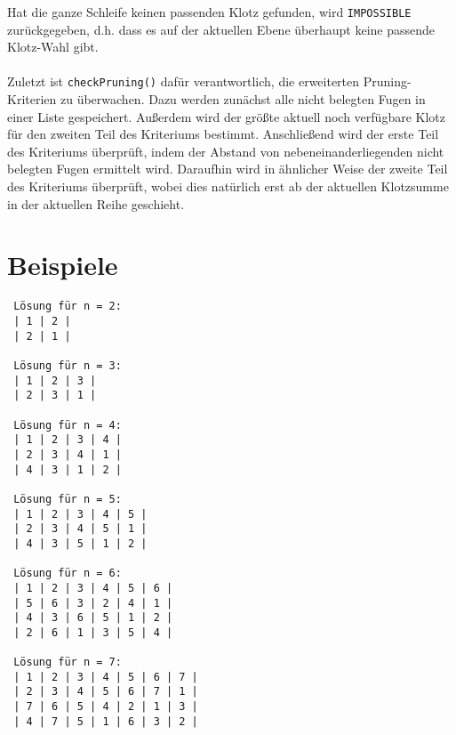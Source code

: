 \documentclass[a4paper, notitlepage, 12pt]{scrartcl}
\begin{document}
Hat die ganze Schleife keinen passenden Klotz gefunden, wird \texttt{IMPOSSIBLE} zurückgegeben, d.h. dass es auf der aktuellen Ebene überhaupt keine passende Klotz-Wahl gibt.
\\ \\
Zuletzt ist \texttt{checkPruning()} dafür verantwortlich, die erweiterten Pruning-Kriterien zu überwachen. Dazu werden zunächst alle nicht belegten Fugen in einer Liste gespeichert. Außerdem wird der größte aktuell noch verfügbare Klotz für den zweiten Teil des Kriteriums bestimmt. Anschließend wird der erste Teil des Kriteriums überprüft, indem der Abstand von nebeneinanderliegenden nicht belegten Fugen ermittelt wird. Daraufhin wird in ähnlicher Weise der zweite Teil des Kriteriums überprüft, wobei dies natürlich erst ab der aktuellen Klotzsumme in der aktuellen Reihe geschieht.
\section{Beispiele}
 \begin{multicols}{2}
 \begin{verbatim}
 Lösung für n = 2: 
 | 1 | 2 | 
 | 2 | 1 |
 
 Lösung für n = 3:
 | 1 | 2 | 3 | 
 | 2 | 3 | 1 |
 
 Lösung für n = 4: 
 | 1 | 2 | 3 | 4 | 
 | 2 | 3 | 4 | 1 | 
 | 4 | 3 | 1 | 2 |
 
 Lösung für n = 5: 
 | 1 | 2 | 3 | 4 | 5 | 
 | 2 | 3 | 4 | 5 | 1 | 
 | 4 | 3 | 5 | 1 | 2 |
 
 Lösung für n = 6: 
 | 1 | 2 | 3 | 4 | 5 | 6 | 
 | 5 | 6 | 3 | 2 | 4 | 1 | 
 | 4 | 3 | 6 | 5 | 1 | 2 | 
 | 2 | 6 | 1 | 3 | 5 | 4 |
 
 Lösung für n = 7:
 | 1 | 2 | 3 | 4 | 5 | 6 | 7 | 
 | 2 | 3 | 4 | 5 | 6 | 7 | 1 | 
 | 7 | 6 | 5 | 4 | 2 | 1 | 3 | 
 | 4 | 7 | 5 | 1 | 6 | 3 | 2 | 
 \end{verbatim}
 \end{multicols}
 \newpage
\end{document}
